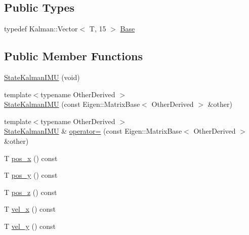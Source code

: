 \subsection*{Public Types}
\begin{DoxyCompactItemize}
\item 
typedef Kalman\+::\+Vector$<$ T, 15 $>$ \hyperlink{classo_cpt_1_1components_1_1sensors_1_1_state_kalman_i_m_u_a47c8a24bf766e317c7c6374689467264}{Base}
\end{DoxyCompactItemize}
\subsection*{Public Member Functions}
\begin{DoxyCompactItemize}
\item 
\hyperlink{classo_cpt_1_1components_1_1sensors_1_1_state_kalman_i_m_u_a2877c1b6028be91d85c9fb4eef28c158}{State\+Kalman\+I\+MU} (void)
\item 
{\footnotesize template$<$typename Other\+Derived $>$ }\\\hyperlink{classo_cpt_1_1components_1_1sensors_1_1_state_kalman_i_m_u_a4ca7aad5fc5d4eb14f5bf07579392fe3}{State\+Kalman\+I\+MU} (const Eigen\+::\+Matrix\+Base$<$ Other\+Derived $>$ \&other)
\item 
{\footnotesize template$<$typename Other\+Derived $>$ }\\\hyperlink{classo_cpt_1_1components_1_1sensors_1_1_state_kalman_i_m_u}{State\+Kalman\+I\+MU} \& \hyperlink{classo_cpt_1_1components_1_1sensors_1_1_state_kalman_i_m_u_ad906bc0da83225aff73b765af99d5c5b}{operator=} (const Eigen\+::\+Matrix\+Base$<$ Other\+Derived $>$ \&other)
\item 
T \hyperlink{classo_cpt_1_1components_1_1sensors_1_1_state_kalman_i_m_u_ac0efd425529d4e3d6297e2a36c97ba54}{pos\+\_\+x} () const
\item 
T \hyperlink{classo_cpt_1_1components_1_1sensors_1_1_state_kalman_i_m_u_aadf3572aedab8c11db304bed654cf2b7}{pos\+\_\+y} () const
\item 
T \hyperlink{classo_cpt_1_1components_1_1sensors_1_1_state_kalman_i_m_u_aad071acb42796e2e8a1c2361c326a50d}{pos\+\_\+z} () const
\item 
T \hyperlink{classo_cpt_1_1components_1_1sensors_1_1_state_kalman_i_m_u_aa13bf50070ea8044635e336181778789}{vel\+\_\+x} () const
\item 
T \hyperlink{classo_cpt_1_1components_1_1sensors_1_1_state_kalman_i_m_u_a50172396bd207a909ca324abd5b5d22d}{vel\+\_\+y} () const
\item 

\end{DoxyCompactItemize}
